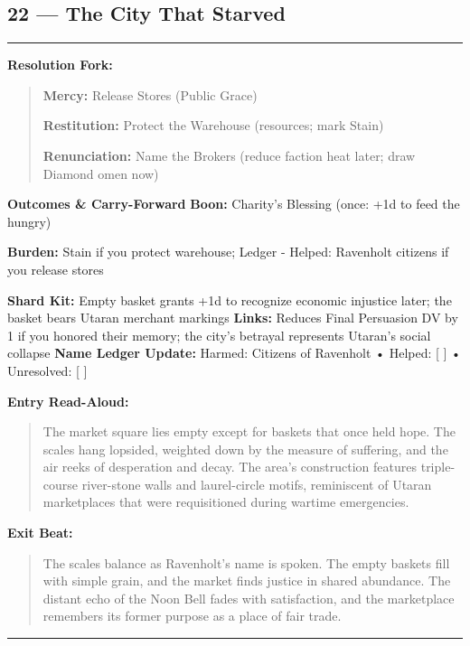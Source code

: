 \documentclass[18pt, letterpaper, twoside]{article}
\newenvironment{floorbox}[1]{%
    \begin{center}
    \begin{minipage}{0.95\textwidth}
    \subsection*{#1}
    \vspace{-0.5em}
    \rule{\textwidth}{0.5pt}
    \vspace{0.5em}
}{%
    \vspace{0.5em}
    \rule{\textwidth}{0.5pt}
    \end{minipage}
    \end{center}
}
\newenvironment{resolutionbox}{%
    \vspace{0.5em}
    \noindent\textbf{Resolution Fork:}
    \begin{quote}
}{%
    \end{quote}
    \vspace{0.5em}
}
\newenvironment{boxedtext}[1]{%
    \vspace{0.5em}
    \noindent\textbf{#1}
    \begin{quote}
}{%
    \end{quote}
    \vspace{0.5em}
}
\newcommand{\boon}[1]{\noindent\textbf{Boon:} #1\par}
\newcommand{\burden}[1]{\noindent\textbf{Burden:} #1\par}
\newcommand{\entrytext}[1]{\begin{boxedtext}{Entry Read-Aloud:} #1 \end{boxedtext}}
\newcommand{\exittext}[1]{\begin{boxedtext}{Exit Beat:} #1 \end{boxedtext}}
\begin{document}
\begin{floorbox}{22 --- The City That Starved}
\begin{resolutionbox}
\textbf{Mercy:} Release Stores (Public Grace)

\textbf{Restitution:} Protect the Warehouse (resources; mark Stain)

\textbf{Renunciation:} Name the Brokers (reduce faction heat later; draw Diamond omen now)
\end{resolutionbox}

\textbf{Outcomes \& Carry-Forward}
\boon{Charity's Blessing (once: +1d to feed the hungry)}
\burden{Stain if you protect warehouse; Ledger - Helped: Ravenholt citizens if you release stores}
\textbf{Shard Kit:} Empty basket grants +1d to recognize economic injustice later; the basket bears Utaran merchant markings
\textbf{Links:} Reduces Final Persuasion DV by 1 if you honored their memory; the city's betrayal represents Utaran's social collapse
\textbf{Name Ledger Update:} Harmed: Citizens of Ravenholt • Helped: [ ] • Unresolved: [ ]

\entrytext{The market square lies empty except for baskets that once held hope. The scales hang lopsided, weighted down by the measure of suffering, and the air reeks of desperation and decay. The area's construction features triple-course river-stone walls and laurel-circle motifs, reminiscent of Utaran marketplaces that were requisitioned during wartime emergencies.}

\exittext{The scales balance as Ravenholt's name is spoken. The empty baskets fill with simple grain, and the market finds justice in shared abundance. The distant echo of the Noon Bell fades with satisfaction, and the marketplace remembers its former purpose as a place of fair trade.}
\end{floorbox}
\end{document}
